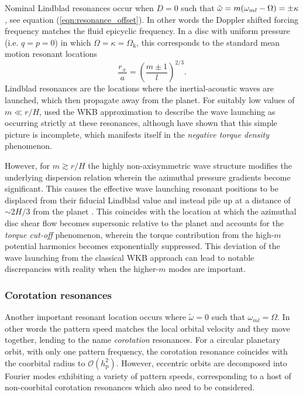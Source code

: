 Nominal Lindblad resonances occur when $D = 0$ such that $\Tilde{\omega}=m(\omega_{ml}-\Omega) = \pm \kappa$, see equation (\ref{eqn:resonance_offset}). In other words the Doppler shifted forcing frequency matches the fluid epicyclic frequency. In a disc with uniform pressure (i.e. $q=p=0$) in which $\Omega = \kappa =\Omega_\textrm{k}$, this corresponds to the standard mean motion resonant locations
%
\begin{equation}
    \label{eqn:lindblad_resonances}
    \frac{r_{\pm}}{a} = \left(\frac{m\pm 1}{l}\right)^{2/3}.
\end{equation}
%
Lindblad resonances are the locations where the inertial-acoustic waves are launched, which then propagate away from the planet. For suitably low values of $m \ll r/H$, \cite{GoldreichTremaine_1979} used the WKB approximation to describe the wave launching as occurring strictly at these resonances, although \citet{RafikovPetrovich_2012} have shown that this simple picture is incomplete, which manifests itself in the \textit{negative torque density} phenomenon. 

However, for $m \gtrsim r/H$ the highly non-axisymmetric wave structure modifies the underlying dispersion relation wherein the azimuthal pressure gradients become significant. This causes the effective wave launching resonant positions to be displaced from their fiducial Lindblad value and instead pile up at a  distance of $\sim 2H/3$ from the planet \citep{Artymowicz_1993}. This coincides with the location at which the azimuthal disc shear flow becomes supersonic relative to the planet \citep{GoodmanRafikov_2001} and accounts for the \textit{torque cut-off} phenomenon, wherein the torque contribution from the high-$m$ potential harmonics becomes exponentially suppressed. This deviation of the wave launching from the classical \cite{GoldreichTremaine_1979} WKB approach can lead to notable discrepancies with reality when the higher-$m$ modes are important.   

\subsubsection{Corotation resonances}
\label{subsubsec:corotation}

Another important resonant location occurs where $\tilde{\omega} = 0$ such that $\omega_{ml} = \Omega$. In other words the pattern speed matches the local orbital velocity and they move together, lending to the name \textit{corotation} resonances. For a circular planetary orbit, with only one pattern frequency, the corotation resonance coincides with the coorbital radius to $\mathcal{O}(h_\textrm{p}^2)$. However, eccentric orbits are decomposed into Fourier modes exhibiting a variety of pattern speeds, corresponding to a host of non-coorbital corotation resonances \citep{GoldreichTremaine_1980} which also need to be considered. 

